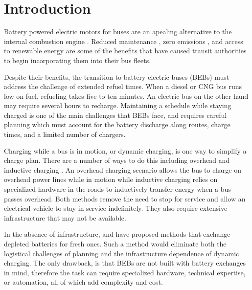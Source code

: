 \section{Introduction}
\par  Battery powered electric motors for buses are an apealing alternative to the internal combustion engine \cite{Mahmoud2016}. Reduced maintenance \cite{poornesh_comparative_2020}, zero emissions \cite{kato_comparative_2013}, and access to renewable energy \cite{cheng_smart_2020} are some of the benefits that have caused transit authorities to begin incorporating them into their bus fleets.  
\par Despite their benefits, the transition to battery electric buses (BEBs) must address the challenge of extended refuel times. When a diesel or CNG bus runs low on fuel, refueling takes five to ten minutes.  An electric bus on the other hand may require several hours to recharge. Maintaining a schedule while staying charged is one of the main challenges that BEBs face, and requires careful planning which must account for the battery discharge along routes, charge times, and a limited number of chargers. 
\par Charging while a bus is in motion, or dynamic charging, is one way to simplify a charge plan. There are a number of ways to do this including overhead \cite{csonka_optimization_2021} and inductive charging \cite{jeong_automatic_2018} \cite{balde_electric_2019}. An overhead charging scenario allows the bus to charge on overhead power lines while in motion while inductive charging relies on specialized hardware in the roads to inductively transfer energy when a bus passes overhead. Both methods remove the need to stop for service and allow an electrical vehicle to stay in service indefinitely. They also require extensive infrastructure \cite{Alwesabi_2022_Robust} that may not be available.

\par In the absence of infrastructure, \cite{jain_battery_2020} and \cite{xian_zhang_optimal_2016} have proposed methods that exchange depleted batteries for fresh ones. Such a method would eliminate both the logistical challenges of planning and the infrastructure dependence of dynamic charging. The only drawback, is that BEBs are not built with battery exchanges in mind, therefore the task can require specialized hardware, technical expertise, or automation, all of which add complexity and cost.

